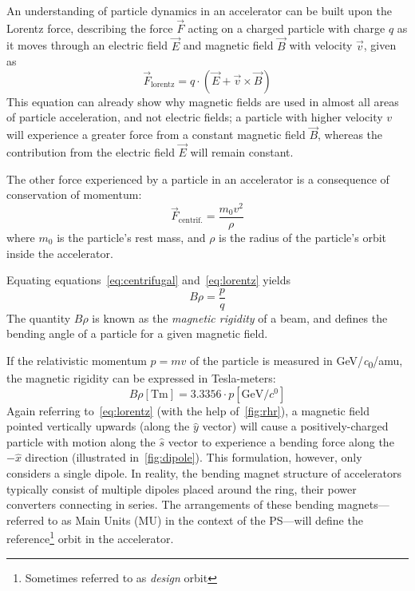 \documentclass[11pt]{report}
\begin{document}
An understanding of particle dynamics in an accelerator can be built upon the Lorentz force, describing the force $\vec F$ acting on a charged particle with charge $q$ as it moves through an electric field $\vec E$ and magnetic field $\vec B$ with velocity $\vec v$, given as
\begin{equation}
\vec F_{\text{lorentz}} = q\cdot(\vec E+ \vec v\times\vec B)\label{eq:lorentz}
\end{equation}
This equation can already show why magnetic fields are used in almost all areas of particle acceleration, and not electric fields; a particle with higher velocity $v$ will experience a greater force from a constant magnetic field $\vec B$, whereas the contribution from the electric field $\vec E$ will remain constant.

The other force experienced by a particle in an accelerator is a consequence of conservation of momentum:
\begin{equation}
\vec F_{\text{centrif.}}=\frac{m_0v^2}{\rho}\label{eq:centrifugal}
\end{equation} where $m_0$ is the particle's rest mass, and $\rho$ is the radius of the particle's orbit inside the accelerator.

Equating equations~\ref{eq:centrifugal} and~\ref{eq:lorentz} yields
\begin{equation}
B\rho=\frac pq
\label{eq:brho}
\end{equation}
The quantity $B\rho$ is known as the \textit{magnetic rigidity} of a beam, and defines the bending angle of a particle for a given magnetic field. 

If the relativistic momentum $p=mv$ of the particle is measured in \unit[per-mode = symbol]{\GeV\per\clight\per amu}, the magnetic rigidity can be expressed in Tesla-meters:
\begin{equation}
B\rho \left[\unit{\tesla\meter}\right] = 3.3356\cdot p\left[\unit{\giga\electronvolt\per\clight}\right]
\end{equation} %
Again referring to~\autoref{eq:lorentz} (with the help of~\autoref{fig:rhr}), a magnetic field pointed vertically upwards (along the $\hat y$ vector) will cause a positively-charged particle with motion along the $\hat s$ vector to experience a bending force along the $-\hat x$ direction (illustrated in~\autoref{fig:dipole}). This formulation, however, only considers a single dipole. In reality, the bending magnet structure of accelerators typically consist of multiple dipoles placed around the ring, their power converters connecting in series. The arrangements of these bending magnets---referred to as Main Units (MU) in the context of the PS---will define the reference\footnote{Sometimes referred to as \textit{design} orbit} orbit in the accelerator.
\end{document}
